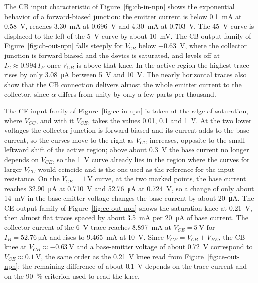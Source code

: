 \documentclass[12pt,a4paper]{article}
\begin{document}
	\newpage
	The CB input characteristic of Figure~\ref{fig:cb-in-npn} shows the
	exponential behavior of a forward-biased junction: the emitter current is below
	\SI{0.1}{\milli\ampere} at \SI{0.58}{\volt}, reaches
	\SI{3.30}{\milli\ampere} at \SI{0.696}{\volt} and \SI{4.30}{\milli\ampere}
	at \SI{0.703}{\volt}. The \SI{45}{\volt} curve is displaced to the left
	of the \SI{5}{\volt} curve by about \SI{10}{\milli\volt}. The CB output
	family of Figure~\ref{fig:cb-out-npn} falls steeply for $V_{CB}$ below
	\SI{-0.63}{\volt}, where the collector junction is forward biased and the
	device is saturated, and levels off at $I_C \approx 0.994\,I_E$ once
	$V_{CB}$ is above that knee. In the active region the highest trace rises
	by only \SI{3.08}{\micro\ampere} between \SI{5}{\volt} and
	\SI{10}{\volt}. The nearly horizontal
	traces also show that the CB connection delivers almost the whole emitter
	current to the collector, since $\alpha$ differs from unity by only a few
	parts per thousand.

	The CE input family of Figure~\ref{fig:ce-in-npn} is taken at the edge of
	saturation, where $V_{CC}$, and with it $V_{CE}$, takes the values 0.01, 0.1 and
	\SI{1}{\volt}. At the two lower voltages the collector junction is
	forward biased and its current adds to the base current, so the curves
	move to the right as $V_{CC}$ increases, opposite to the small leftward
	shift of the active region; above about \SI{0.3}{\volt} the base
	current no longer depends on $V_{CE}$, so the \SI{1}{\volt} curve
	already lies in the region where the curves for larger $V_{CC}$ would
	coincide and is the one used as the reference for the input resistance.
	On the $V_{CE} = \SI{1}{\volt}$ curve, at the two marked points, the base current reaches
	\SI{32.90}{\micro\ampere} at \SI{0.710}{\volt} and
	\SI{52.76}{\micro\ampere} at \SI{0.724}{\volt}, so a change of only about
	\SI{14}{\milli\volt} in the base-emitter voltage changes the base current
	by about \SI{20}{\micro\ampere}. The CE output
	family of Figure~\ref{fig:ce-out-npn} shows the saturation knee at
	\SI{0.21}{\volt}, then almost flat traces spaced by about
	\SI{3.5}{\milli\ampere} per \SI{20}{\micro\ampere} of base current. The
	collector current of the \SI{6}{\volt} trace reaches
	\SI{8.897}{\milli\ampere} at $V_{CE} = \SI{5}{\volt}$ for
	$I_B = \SI{52.76}{\micro\ampere}$ and rises to \SI{9.465}{\milli\ampere}
	at \SI{10}{\volt}.
	Since $V_{CE} = V_{CB} + V_{BE}$, the CB knee at
	$V_{CB} \approx \SI{-0.63}{\volt}$ and a base-emitter voltage of about
	\SI{0.72}{\volt} correspond to $V_{CE} \approx \SI{0.1}{\volt}$, the same
	order as the \SI{0.21}{\volt} knee read from
	Figure~\ref{fig:ce-out-npn}; the remaining difference of about
	\SI{0.1}{\volt} depends on the trace current and on the \SI{90}{\percent}
	criterion used to read the knee.
\end{document}
